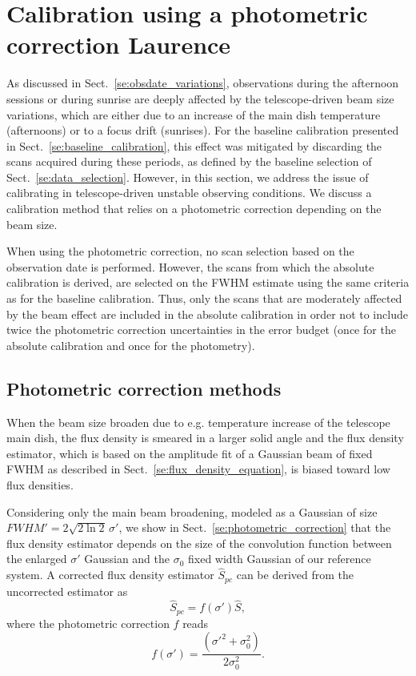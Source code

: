 \section{Calibration using a photometric correction {\color{blue} Laurence} }
\label{se:photocorr_calibration}

As discussed in Sect.~\ref{se:obsdate_variations}, observations during the
afternoon sessions or
during sunrise
are deeply affected by the telescope-driven beam
size variations, which are either due to an increase of the main dish
temperature (afternoons) or to a focus drift (sunrises).
For the baseline calibration presented in
Sect.~\ref{se:baseline_calibration}, this effect was mitigated by
discarding the scans acquired during these periods, as defined by the
baseline selection of Sect.~\ref{se:data_selection}. However, in
this section, we address the issue of calibrating in
telescope-driven unstable observing conditions. We discuss a
calibration method that relies on a photometric correction
depending on the beam size. 

When using the photometric correction, no scan selection based on the
observation date is performed. However, the scans from which the
absolute calibration is derived, are selected on the FWHM estimate
using the same criteria as for the baseline calibration. Thus, only
the scans that are moderately affected by the beam effect are included
in the absolute calibration in order not to include twice the
photometric correction uncertainties in the error budget (once for the
absolute calibration and once for the photometry).


\subsection{Photometric correction methods}
\label{se:photocorr_methods}

When the beam size broaden due to e.g. temperature increase of the
telescope main dish, the flux density is smeared in a larger solid angle and
the flux density estimator, which is based on the amplitude fit of a
Gaussian beam of fixed FWHM as described in
Sect.~\ref{se:flux_density_equation}, is biased toward low flux densities.

Considering only the main beam broadening, modeled as a Gaussian of
size $FWHM' = 2 \sqrt{2\ln{2}} \, \sigma '$, we show in
Sect.~\ref{se:photometric_correction} that
the flux density estimator depends on the size of the convolution
function between the enlarged $\sigma '$ Gaussian and the 
$\sigma_0$ fixed width Gaussian of our reference system.
A corrected flux density estimator $\hat{S}_{pc}$ can be derived from
the uncorrected estimator as
\begin{equation}
  \hat{S}_{pc} = f(\sigma')\hat{S},  
\end{equation} 
where the photometric correction $f$ reads
\begin{equation}
  f(\sigma') = \frac{(\sigma'^2 + \sigma_0^2)}{2 \sigma_0^2}. 
\end{equation} 

